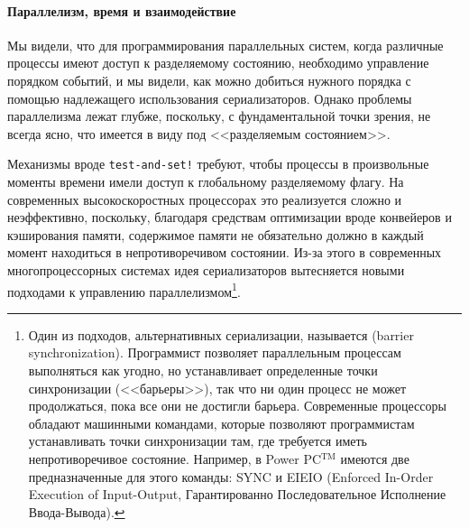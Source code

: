 \paragraph{Параллелизм, время и взаимодействие}


Мы видели, что для программирования параллельных систем,
когда различные процессы имеют доступ к разделяемому состоянию,
необходимо управление порядком событий, и мы видели, как можно добиться
нужного порядка с помощью надлежащего использования сериализаторов.
Однако проблемы параллелизма лежат глубже, поскольку, с
фундаментальной точки зрения, не всегда ясно, что имеется в виду под
<<разделяемым состоянием>>.

{Механизмы вроде {\tt test-and-set!} требуют, чтобы
процессы в произвольные моменты времени имели доступ к глобальному разделяемому
флагу.  На современных высокоскоростных процессорах это реализуется сложно и
неэффективно, поскольку, благодаря средствам оптимизации
вроде конвейеров и кэширования памяти,  содержимое памяти
не обязательно должно в каждый момент находиться в непротиворечивом
состоянии.  Из-за этого в современных многопроцессорных системах
идея сериализаторов вытесняется новыми подходами к управлению
параллелизмом\footnote{Один из подходов, альтернативных сериализации,
называется  (barrier synchronization).  Программист позволяет параллельным процессам
выполняться как угодно, но устанавливает определенные точки
синхронизации (<<барьеры>>), так что ни один процесс не может
продолжаться, пока все они не достигли барьера.  Современные
процессоры обладают машинными командами, которые позволяют
программистам устанавливать точки синхронизации там, где требуется
иметь непротиворечивое состояние.  Например, в   Power PC${}^{\mbox{TM}}$ имеются две
предназначенные для этого
команды:  SYNC и  EIEIO (Enforced In-Order Execution of Input-Output,
Гарантированно Последовательное Исполнение Ввода-Вывода).
}.

}

